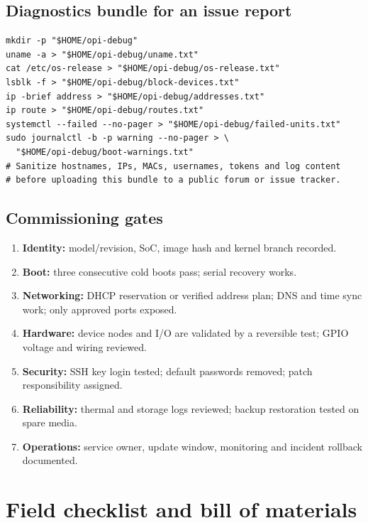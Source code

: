 \documentclass[10pt,oneside,openany]{report}
\begin{document}
\section{Diagnostics bundle for an issue report}
\begin{lstlisting}[style=sh]
mkdir -p "$HOME/opi-debug"
uname -a > "$HOME/opi-debug/uname.txt"
cat /etc/os-release > "$HOME/opi-debug/os-release.txt"
lsblk -f > "$HOME/opi-debug/block-devices.txt"
ip -brief address > "$HOME/opi-debug/addresses.txt"
ip route > "$HOME/opi-debug/routes.txt"
systemctl --failed --no-pager > "$HOME/opi-debug/failed-units.txt"
sudo journalctl -b -p warning --no-pager > \
  "$HOME/opi-debug/boot-warnings.txt"
# Sanitize hostnames, IPs, MACs, usernames, tokens and log content
# before uploading this bundle to a public forum or issue tracker.
\end{lstlisting}
\section{Commissioning gates}
\begin{enumerate}
\item \textbf{Identity:} model/revision, SoC, image hash and kernel branch recorded.
\item \textbf{Boot:} three consecutive cold boots pass; serial recovery works.
\item \textbf{Networking:} DHCP reservation or verified address plan; DNS and time sync work; only approved ports exposed.
\item \textbf{Hardware:} device nodes and I/O are validated by a reversible test; GPIO voltage and wiring reviewed.
\item \textbf{Security:} SSH key login tested; default passwords removed; patch responsibility assigned.
\item \textbf{Reliability:} thermal and storage logs reviewed; backup restoration tested on spare media.
\item \textbf{Operations:} service owner, update window, monitoring and incident rollback documented.
\end{enumerate}

\appendix
\chapter{Field checklist and bill of materials}
\end{document}
